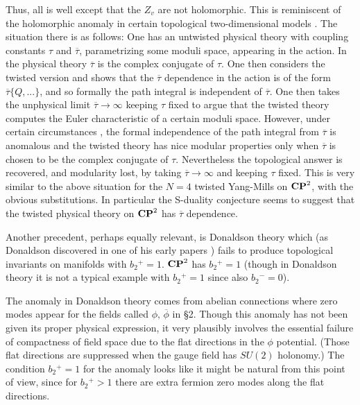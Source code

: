 \documentclass[12pt]{article}
\numberwithin{equation}{section}
\def\bar{\overline}
\begin{document}
\bigskip
{}

Thus, all is well except that the $Z_v$ are not holomorphic.
This is reminiscent of the holomorphic anomaly in certain topological
two-dimensional models \cite{bcov}.
The situation there is as follows:  One has an untwisted physical
theory with coupling constants $\tau $ and $\bar \tau$, parametrizing
some moduli space,
appearing in the
action.  In the physical theory $\bar \tau $ is the complex conjugate
of $\tau$.  One then considers the twisted version and shows that
the $\bar \tau$ dependence
in the action is of the form ${\bar \tau}\{ Q,...\}$, and
so formally the path integral is independent of $\bar \tau$.  One
then takes the unphysical limit $\bar \tau \rightarrow \infty$
keeping $\tau$ fixed to argue
that the twisted theory computes the Euler characteristic
of a  certain moduli space.  However, under certain circumstances \cite{bcov},
the formal independence of the path integral from $\bar \tau$
is anomalous and  the twisted theory has nice modular
properties only when $\bar \tau$ is chosen
to be the complex conjugate of $\tau$.  Nevertheless the topological
answer is recovered, and modularity lost, by taking
${\bar \tau}\rightarrow \infty$ and keeping $\tau $ fixed.
This is very similar to the above situation for the $N=4$
twisted Yang-Mills on ${\bf CP}^2$, with the obvious substitutions.
In particular the S-duality conjecture seems to suggest
that the twisted physical theory on
${\bf CP}^2$ has $\bar \tau$ dependence.

Another precedent, perhaps equally relevant, is Donaldson theory
which  (as Donaldson discovered in one of his early papers
\cite{don})
fails to produce topological invariants
on manifolds with $b_2{}^+=1$. ${\bf CP}^2$ has $b_2{}^+=1$
(though in Donaldson theory it is not a typical example with $b_2{}^+=1$
since also $b_2{}^-=0$).

The anomaly in Donaldson theory comes from abelian connections where
zero modes appear for the fields called $\phi,\,\bar\phi$ in \S2.
Though this anomaly has not been given its proper physical expression,
it very plausibly involves the essential failure of compactness
of field space due to the flat directions in the $\phi$ potential.
(Those flat directions are suppressed when the gauge field has $SU(2)$
holonomy.)
The condition $b_2{}^+=1$ for the anomaly looks like it might be
natural from this point of
view, since for $b_2{}^+>1$ there are extra
fermion zero modes along the flat directions.
\end{document}
